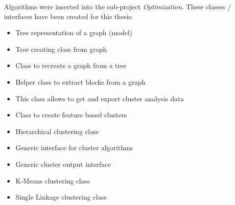 Algorithms were inserted into the sub-project \textit{Optimization}. These classes / interfaces have been created for this thesis:
\begin{itemize}
    \item Tree representation of a graph (model) \newline
    \item Tree creating class from graph \newline
    \item Class to recreate a graph from a tree \newline
    \item Helper class to extract blocks from a graph \newline
    \item This class allows to get and export cluster analysis data \newline 
    \item  Class to create feature based clusters \newline 
    \item Hierarchical clustering class \newline 
    \item Generic interface for cluster algorithms\newline
    \item Generic cluster output interface \newline 
    \item K-Means clustering class \newline
    \item Single Linkage clustering class \newline
\end{itemize}

\pagebreak
